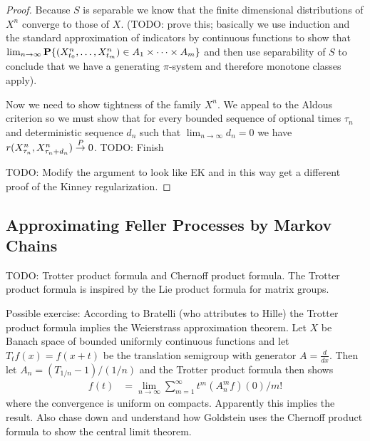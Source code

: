 \begin{proof}
Because $S$ is separable we know that the finite dimensional distributions of $X^n$ converge to those of $X$.  (TODO: prove this; basically we use induction and the standard approximation of indicators by continuous functions to show that $\lim_{n \to \infty} \textbf{P}\{(X^n_{t_0}, \dotsc, X^n_{t_m}) \in A_1 \times \dotsb \times A_m\}$ and then use separability of $S$ to conclude that we have a generating $\pi$-system and therefore monotone classes apply).

Now we need to show tightness of the family $X^n$.  We appeal to the Aldous criterion so we must show that for every bounded sequence of optional times $\tau_n$ and deterministic sequence $d_n$ such that $\lim_{n \to \infty} d_n = 0$ we have $r(X^n_{\tau_n}, X^n_{\tau_n + d_n}) \overset{P}\to 0$.
TODO: Finish

TODO: Modify the argument to look like EK and in this way get a different proof of the Kinney regularization.
\end{proof}

\subsection{Approximating Feller Processes by Markov Chains}

TODO: Trotter product formula and Chernoff product formula.  The Trotter product formula is inspired by the Lie product formula for matrix groups.

Possible exercise: According to Bratelli (who attributes to Hille) the Trotter product formula implies the Weierstrass approximation theorem.  Let $X$ be Banach space of bounded uniformly continuous functions and let $T_tf(x) = f(x+t)$ be the translation semigroup with generator $A=\frac{d}{dx}$.  Then let $A_n = (T_{1/n} -1)/(1/n)$ and the Trotter product formula then shows 
\begin{align*}
f(t) &= \lim_{n \to \infty} \sum_{m=1}^\infty t^m (A^m_n f)(0)/m!
\end{align*} 
where the convergence is uniform on compacts.  Apparently this implies the result.  Also chase down and understand how Goldstein uses the Chernoff product formula to show the central limit theorem.